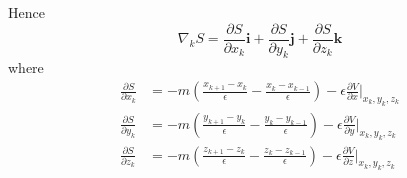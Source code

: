 \documentclass[12pt]{article}
\begin{document}
Hence
\begin{equation*}
\nabla_kS
=\frac{\partial S}{\partial x_k}\mathbf i
+\frac{\partial S}{\partial y_k}\mathbf j
+\frac{\partial S}{\partial z_k}\mathbf k
\end{equation*}
where
\begin{align*}
\frac{\partial S}{\partial x_k}
&=-m\left(\frac{x_{k+1}-x_k}{\epsilon}-\frac{x_k-x_{k-1}}{\epsilon}\right)
-\epsilon\frac{\partial V}{\partial x}\bigg|_{x_k,y_k,z_k}
\\
\frac{\partial S}{\partial y_k}
&=-m\left(\frac{y_{k+1}-y_k}{\epsilon}-\frac{y_k-y_{k-1}}{\epsilon}\right)
-\epsilon\frac{\partial V}{\partial y}\bigg|_{x_k,y_k,z_k}
\\
\frac{\partial S}{\partial z_k}
&=-m\left(\frac{z_{k+1}-z_k}{\epsilon}-\frac{z_k-z_{k-1}}{\epsilon}\right)
-\epsilon\frac{\partial V}{\partial z}\bigg|_{x_k,y_k,z_k}
\end{align*}

\end{document}
